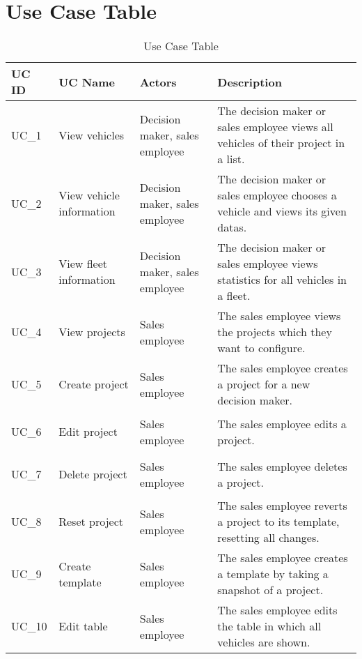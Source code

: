 \section{Use Case Table}
\sffamily
\begin{footnotesize}
  \renewcommand{\arraystretch}{1.4}
  \begin{longtable}[i i i L]{ p{} p{} p{} p{} }
    \caption                       %
        {Use Case Table} %
        \\
    \toprule
    \textbf{UC ID} & \textbf{UC Name} & \textbf{Actors}  & \textbf{Description}\\
    \midrule
    \hypertarget{Ref:UC1}{UC\_1} & View vehicles & Decision maker, sales employee & The decision maker or sales employee views all vehicles of their project in a list.\\
    \hypertarget{Ref:UC2}{UC\_2} & View vehicle information & Decision maker, sales employee & The decision maker or sales employee chooses a vehicle and views its given \glspl{data}.\\
    \hypertarget{Ref:UC3}{UC\_3}  & View fleet information & Decision maker, sales employee & The decision maker or sales employee views statistics for all vehicles in a fleet.\\
    \hypertarget{Ref:UC4}{UC\_4}  & View projects & Sales employee & The sales employee views the projects which they want to configure.\\
    \hypertarget{Ref:UC5}{UC\_5} & Create project & Sales employee & The sales employee creates a project for a new decision maker.\\
    \hypertarget{Ref:UC6}{UC\_6} & Edit project & Sales employee & The sales employee edits a project.\\
    \hypertarget{Ref:UC7}{UC\_7} & Delete project & Sales employee & The sales employee deletes a project.\\
    \hypertarget{Ref:UC8}{UC\_8} & Reset project & Sales employee & The sales employee reverts a project to its template, resetting all changes.\\
    \hypertarget{Ref:UC9}{UC\_9} & Create template & Sales employee & The sales employee creates a template by taking a snapshot of a project.\\
    \hypertarget{Ref:UC10}{UC\_10} & Edit table & Sales employee & The sales employee edits the table in which all vehicles are shown.\\

\end{longtable}
\end{footnotesize}
